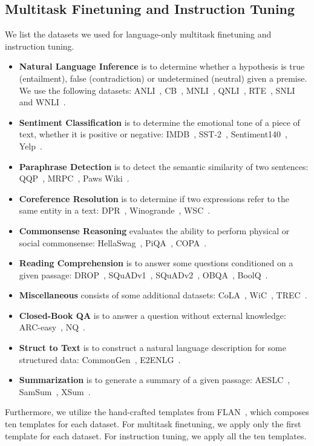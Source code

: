 \documentclass{article}
\theoremstyle{plain}
\theoremstyle{definition}
\theoremstyle{remark}
\begin{document}
\subsection{Multitask Finetuning and Instruction Tuning}
\label{app:corpora:data:lang:ft}
We list the datasets we used for language-only multitask finetuning and instruction tuning.
\begin{itemize}[leftmargin=*]
\item \textbf{Natural Language Inference} is to determine whether a hypothesis is true (entailment), false (contradiction) or undetermined (neutral) given a premise.
We use the following datasets: ANLI~\citep{anli}, CB~\citep{cb}, MNLI~\citep{mnli}, QNLI~\citep{squad}, RTE~\citep{rte1,rte2,rte3,rte5}, SNLI~\citep{snli} and WNLI~\citep{wsc}.
\item \textbf{Sentiment Classification} is to determine the emotional tone of a piece of text, whether it is positive or negative: IMDB~\citep{imdb}, SST-2~\citep{sst2}, Sentiment140~\citep{sent140}, Yelp~\citep{yelp}.
\item \textbf{Paraphrase Detection} is to detect the semantic similarity of two sentences: QQP~\citep{glue}, MRPC~\citep{mrpc}, Paws Wiki~\citep{paws}.
\item \textbf{Coreference Resolution} is to determine if two expressions refer to the same entity in a text: DPR~\citep{dpr}, Winogrande~\citep{winogrande}, WSC~\citep{wsc}.
\item \textbf{Commonsense Reasoning} evaluates the ability to perform physical or social commonsense: HellaSwag~\citep{hellaswag}, PiQA~\citep{piqa}, COPA~\citep{copa}.
\item \textbf{Reading Comprehension} is to answer some questions conditioned on a given passage: DROP~\citep{drop}, SQuADv1~\citep{squad}, SQuADv2~\citep{squad2}, OBQA~\citep{obqa}, BoolQ~\citep{boolq}.
\item \textbf{Miscellaneous} consists of some additional datasets: CoLA~\citep{cola}, WiC~\citep{wic}, TREC~\citep{trec1,trec2}.
\item \textbf{Closed-Book QA} is to answer a question without external knowledge: ARC-easy~\citep{arc}, NQ~\citep{nq1,nq2}.
\item \textbf{Struct to Text} is to construct a natural language description for some structured data: CommonGen~\citep{commongen}, E2ENLG~\citep{e2enlg}.
\item \textbf{Summarization} is to generate a summary of a given passage: AESLC~\citep{aeslc}, SamSum~\citep{samsum}, XSum~\citep{xsum}.
\end{itemize}
Furthermore, we utilize the hand-crafted templates from FLAN~\citep{flan}, which composes ten templates for each dataset.
For multitask finetuning, we apply only the first template for each dataset. 
For instruction tuning, we apply all the ten templates.
\end{document}
